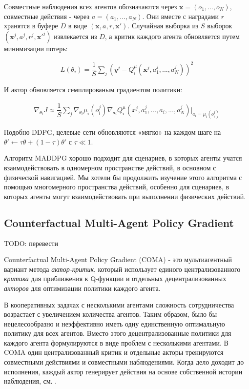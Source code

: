Совместные наблюдения всех агентов обозначаются через $\mathbf{x} = (o_1, ..., o_N)$, совместные действия - через $a = (a_1, ..., a_N)$. Они вместе с наградами $r$ хранятся в буфере $D$ в виде $(\mathbf{x}, a, r, \mathbf{x}')$. Случайная выборка из $S$ выборок $(\mathbf{x}^j, a^j, r^j, \mathbf{x}'^j)$ извлекается из $D$, а критик каждого агента обновляется путем минимизации потерь:

\begin{equation}
    \begin{multlined}
        L(\theta_i) = \dfrac{1}{S} \sum_j (y^j - Q_{i}^\mu (\mathbf x^j, a_{1}^j, ...,a_{N}^j))^2
    \end{multlined}
\end{equation}

И актор обновляется семплированым градиентом политики:

\begin{equation}
    \begin{multlined}
        \nabla_{\theta_i} J \approx \dfrac{1}{S} \sum_j \nabla_{\theta_i} \mu_i (o^j_i) \nabla_{a_i} Q^\mu_i (x^j, a^j_1, ..., a_i, ..., a^j_N)|_{a_i=\mu_i(o^j_i)}
    \end{multlined}
\end{equation}

Подобно DDPG, целевые сети обновляются «мягко» на каждом шаге на $\theta' \leftarrow \tau \theta + (1 - \tau) \theta'$ с $\tau \ll 1$.

Алгоритм MADDPG хорошо подходит для сценариев, в которых агенты учатся взаимодействовать в одномерном пространстве действий, в основном с физической навигацией. Мы хотели бы продолжить изучение этого алгоритма с помощью многомерного пространства действий, особенно для сценариев, в которых агенты могут взаимодействовать при выполнении физических действий.

\subsection{Counterfactual Multi-Agent Policy Gradient} TODO: перевести

Counterfactual Multi-Agent Policy Gradient (COMA) - это мультиагентный вариант метода \textit{актор-критик}, который использует единого централизованного \textit{критика} для приближения к Q-функции и отдельных децентрализованных \textit{акторов} для оптимизации политики каждого агента. \cite{foerster2017counterfactual}

В кооперативных задачах с несколькими агентами сложность сотрудничества возрастает с увеличением количества агентов. Таким образом, было бы нецелесообразно и неэффективно иметь одну единственную оптимальную политику для всех агентов. Вместо этого децентрализованные политики для каждого агента формулируются в виде проблем с несколькими агентами. В COMA один централизованный критик и отдельные акторы тренируются совместными действиями и совместными наблюдениями. Когда дело доходит до исполнения, каждый актор генерирует действия на основе собственной истории наблюдения, см. .

